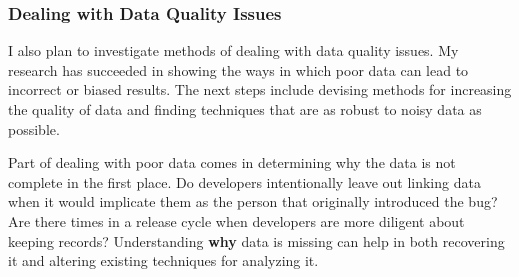 \documentclass[10pt]{article}
\newcommand\Subsection[1]{\subsubsection*{\small #1}}
\begin{document}
\begin{small}
\begin{enumerate}
\end{enumerate}

\Subsection{Dealing with Data Quality Issues}

I also plan to investigate methods of dealing with data quality issues.  My
research has succeeded in showing the ways in which poor data can lead to
incorrect or biased results.  The next steps include devising methods for
increasing the quality of data and finding techniques that are as robust to
noisy data as possible.

Part of dealing with poor data comes in determining why the data is not complete
in the first place.  Do developers intentionally leave out linking data when it would
implicate them as the person that originally introduced the bug?  Are there times
in a release cycle when developers are more diligent about keeping records?  Understanding
\textbf{why} data is missing can help in both recovering it and altering existing techniques
for analyzing it.

\vspace{0.5cm}

\end{small}

\begin{footnotesize}

%
%

\end{footnotesize}
\end{document}
